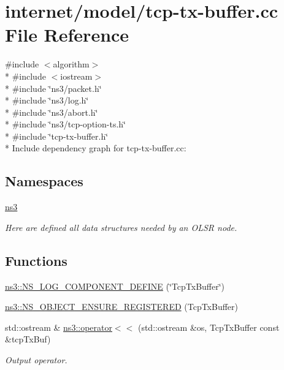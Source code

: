\hypertarget{tcp-tx-buffer_8cc}{}\section{internet/model/tcp-\/tx-\/buffer.cc File Reference}
\label{tcp-tx-buffer_8cc}
{\ttfamily \#include $<$algorithm$>$}\\*
{\ttfamily \#include $<$iostream$>$}\\*
{\ttfamily \#include \char`\"{}ns3/packet.\+h\char`\"{}}\\*
{\ttfamily \#include \char`\"{}ns3/log.\+h\char`\"{}}\\*
{\ttfamily \#include \char`\"{}ns3/abort.\+h\char`\"{}}\\*
{\ttfamily \#include \char`\"{}ns3/tcp-\/option-\/ts.\+h\char`\"{}}\\*
{\ttfamily \#include \char`\"{}tcp-\/tx-\/buffer.\+h\char`\"{}}\\*
Include dependency graph for tcp-\/tx-\/buffer.cc\+:
\subsection*{Namespaces}
\begin{DoxyCompactItemize}
\item 
 \hyperlink{namespacens3}{ns3}
\begin{DoxyCompactList}\small\item\em Here are defined all data structures needed by an O\+L\+SR node. \end{DoxyCompactList}\end{DoxyCompactItemize}
\subsection*{Functions}
\begin{DoxyCompactItemize}
\item 
\hyperlink{namespacens3_a13e174b6c1e984ba668feef8127f23ec}{ns3\+::\+N\+S\+\_\+\+L\+O\+G\+\_\+\+C\+O\+M\+P\+O\+N\+E\+N\+T\+\_\+\+D\+E\+F\+I\+NE} (\char`\"{}Tcp\+Tx\+Buffer\char`\"{})
\item 
\hyperlink{namespacens3_afed89cf10bdf50be2addebfc97cd0a03}{ns3\+::\+N\+S\+\_\+\+O\+B\+J\+E\+C\+T\+\_\+\+E\+N\+S\+U\+R\+E\+\_\+\+R\+E\+G\+I\+S\+T\+E\+R\+ED} (Tcp\+Tx\+Buffer)
\item 
std\+::ostream \& \hyperlink{namespacens3_a09c6eef48efdd7458e7bd81b78895c83}{ns3\+::operator$<$$<$} (std\+::ostream \&os, Tcp\+Tx\+Buffer const \&tcp\+Tx\+Buf)
\begin{DoxyCompactList}\small\item\em Output operator. \end{DoxyCompactList}\end{DoxyCompactItemize}
